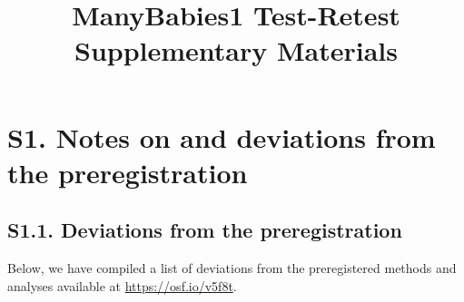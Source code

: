 \documentclass[
  english,
  man, donotrepeattitle,floatsintext]{apa6}
\title{ManyBabies1 Test-Retest Supplementary Materials}
\author{\phantom{0}}
\date{}
\affiliation{\phantom{0}}
\begin{document}
\maketitle

{
\setcounter{tocdepth}{3}
\tableofcontents
}
\newpage

\hypertarget{s1.-notes-on-and-deviations-from-the-preregistration}{%
\section{S1. Notes on and deviations from the preregistration}\label{s1.-notes-on-and-deviations-from-the-preregistration}}

\hypertarget{s1.1.-deviations-from-the-preregistration}{%
\subsection{S1.1. Deviations from the preregistration}\label{s1.1.-deviations-from-the-preregistration}}

Below, we have compiled a list of deviations from the preregistered methods and analyses available at \url{https://osf.io/v5f8t}.
\end{document}
